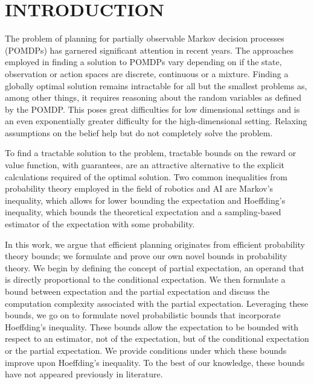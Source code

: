 \section{INTRODUCTION}\label{sec:intro}

The problem of planning for partially observable Markov decision processes (POMDPs) has garnered significant attention in recent years. The approaches employed in finding a solution to POMDPs vary depending on if the state, observation or action spaces are discrete, continuous or a mixture. Finding a globally optimal solution remains intractable for all but the smallest problems as, among other things, it requires reasoning about the random variables as defined by the POMDP. This poses great difficulties for low dimensional settings and is an even exponentially greater difficulty for the high-dimensional setting. Relaxing assumptions on the belief help but do not completely solve the problem.

To find a tractable solution to the problem, tractable bounds on the reward or value function, with guarantees, are an attractive alternative to the explicit calculations required of the optimal solution. Two common inequalities from probability theory employed in the field of robotics and AI are Markov's inequality, which allows for lower bounding the expectation and Hoeffding's inequality, which bounds the theoretical expectation and a sampling-based estimator of the expectation with some probability.

In this work, we argue that efficient planning originates from efficient probability theory bounds; we formulate and prove our own novel bounds in probability theory. We begin by defining the concept of partial expectation, an operand that is directly proportional to the conditional expectation. We then formulate a bound between expectation and the partial expectation and discuss the computation complexity associated with the partial expectation. Leveraging these bounds, we go on to formulate novel probabilistic bounds that incorporate Hoeffding's inequality. These bounds allow the expectation to be bounded with respect to an estimator, not of the expectation, but of the conditional expectation or the partial expectation. We provide conditions under which these bounds improve upon Hoeffding's inequality. To the best of our knowledge, these bounds have not appeared previously in literature.

